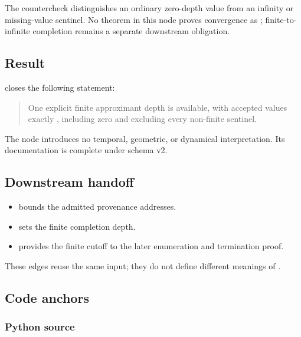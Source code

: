 The countercheck distinguishes an ordinary zero-depth value from an
infinity or missing-value sentinel. No theorem in this node proves
convergence as \texttt{\protect{}}; finite-to-infinite completion remains a
separate downstream obligation.

\subsection{Result}\label{result-1}

\texttt{\protect{}} closes the following statement:

\begin{quote}
One explicit finite approximant depth is available, with accepted values
exactly \texttt{\protect{}}, including zero and excluding every non-finite
sentinel.
\end{quote}

The node introduces no temporal, geometric, or dynamical interpretation.
Its documentation is complete under schema v2.

\subsection{Downstream handoff}\label{downstream-handoff-1}

\begin{itemize}
\tightlist
\item
  \texttt{\protect{}} bounds the admitted provenance
  addresses.
\item
  \texttt{\protect{}} sets the finite completion depth.
\item
  \texttt{\protect{}} provides the finite cutoff to the later
  enumeration and termination proof.
\end{itemize}

These edges reuse the same input; they do not define different meanings
of \texttt{\protect{}}.

\subsection{Code anchors}\label{code-anchors-1}

\subsubsection{Python source}\label{python-source-1}

